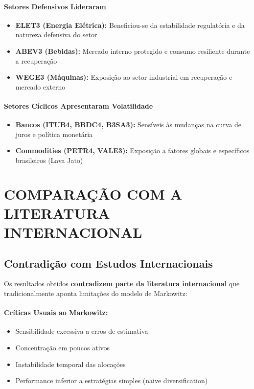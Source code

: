 \paragraph{Setores Defensivos Lideraram}
\begin{itemize}
    \item \textbf{ELET3 (Energia Elétrica):} Beneficiou-se da estabilidade regulatória e da natureza defensiva do setor
    \item \textbf{ABEV3 (Bebidas):} Mercado interno protegido e consumo resiliente durante a recuperação
    \item \textbf{WEGE3 (Máquinas):} Exposição ao setor industrial em recuperação e mercado externo
\end{itemize}

\paragraph{Setores Cíclicos Apresentaram Volatilidade}
\begin{itemize}
    \item \textbf{Bancos (ITUB4, BBDC4, B3SA3):} Sensíveis às mudanças na curva de juros e política monetária
    \item \textbf{Commodities (PETR4, VALE3):} Exposição a fatores globais e específicos brasileiros (Lava Jato)
\end{itemize}

\section{COMPARAÇÃO COM A LITERATURA INTERNACIONAL}

\subsection{Contradição com Estudos Internacionais}

Os resultados obtidos \textbf{contradizem parte da literatura internacional} que tradicionalmente aponta limitações do modelo de Markowitz:

\paragraph{Críticas Usuais ao Markowitz:}
\begin{itemize}
    \item Sensibilidade excessiva a erros de estimativa
    \item Concentração em poucos ativos
    \item Instabilidade temporal das alocações
    \item Performance inferior a estratégias simples (naive diversification)
\end{itemize}

